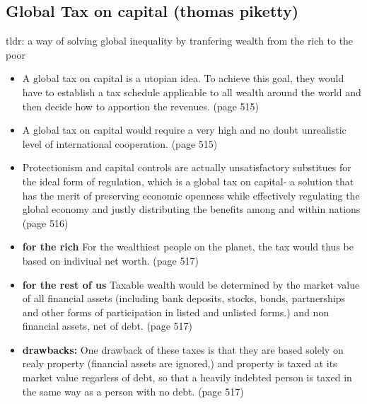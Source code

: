 \documentclass[11pt]{article}
\begin{document}
\subsection{Global Tax on capital (thomas piketty)}
tldr: a way of solving global inequality by tranfering wealth from the rich to the poor
\begin{itemize}
 \item A global tax on capital is a utopian idea. To achieve this goal, they would have to establish a tax schedule applicable to all wealth around the world and then decide how to apportion the revenues. (page 515)
       
 \item A global tax on capital would require a very high and no doubt unrealistic level of international cooperation. (page 515)
 \item Protectionism and capital controls are actually unsatisfactory substitues for the ideal form of regulation, which is a global tax on capital- a solution that has the merit of preserving economic openness while effectively regulating the global economy and justly distributing the benefits among and within nations (page 516)
 \item \textbf{for the rich} For the wealthiest people on the planet, the tax would thus be based on indiviual net worth. (page 517)
 \item \textbf{for the rest of us} Taxable wealth would be determined by the market value of all financial assets (including bank deposits, stocks, bonds, partnerships and other forms of participation in listed and unlisted forms.) and non financial assets, net of debt. (page 517)
 \item \textbf{drawbacks:} One drawback of these taxes is that they are based solely on realy property (financial assets are ignored,) and property is taxed at its market value regarless of debt, so that a heavily indebted person is  taxed in the same way as a person with no debt. (page 517)
\end{itemize}
\end{document}
